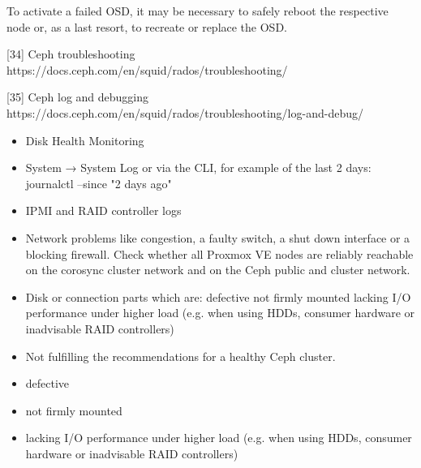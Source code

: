 To activate a failed OSD, it may be necessary to safely reboot the respective node or, as a last resort, to recreate or replace the OSD.

[34] Ceph troubleshooting https://docs.ceph.com/en/squid/rados/troubleshooting/

[35] Ceph log and debugging https://docs.ceph.com/en/squid/rados/troubleshooting/log-and-debug/

\begin{itemize}[leftmargin=2cm]

	\item Disk Health Monitoring

	\item System → System Log or via the CLI, for example of the last 2 days: journalctl --since "2 days ago"

	\item IPMI and RAID controller logs

\end{itemize}

\begin{itemize}[leftmargin=2cm]

	\item Network problems like congestion, a faulty switch, a shut down interface or a blocking firewall. Check whether all Proxmox VE nodes are reliably reachable on the corosync cluster network and on the Ceph public and cluster network.

	\item Disk or connection parts which are: defective not firmly mounted lacking I/O performance under higher load (e.g. when using HDDs, consumer hardware or inadvisable RAID controllers)

	\item Not fulfilling the recommendations for a healthy Ceph cluster.

\end{itemize}

\begin{itemize}[leftmargin=2cm]

	\item defective

	\item not firmly mounted

	\item lacking I/O performance under higher load (e.g. when using HDDs, consumer hardware or inadvisable RAID controllers)

\end{itemize}

